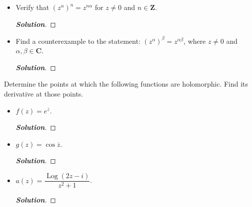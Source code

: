 \documentclass[11pt]{article}
\newenvironment{problem}[2][Problem\!]{\begin{trivlist}
\item[\hskip \labelsep {\bfseries #1}\hskip \labelsep {\bfseries #2.}]}{\end{trivlist}}
\newenvironment{solution}{\begin{proof}[\textbf{\textit{Solution}}]}{\end{proof}}
\newcommand{\zz}{\mathbf Z}   %
\newcommand{\cc}{\mathbf C}   %
\newcommand{\plog}{\operatorname{Log}} %
\begin{document}
\newpage  %

\begin{problem}{5.3}\hfill
\begin{itemize}[itemsep=3em]
\item[(a)] Verify that $(z^\alpha)^n = z^{n\alpha}$ for $z \neq 0$ and $n \in \zz$.
\begin{solution}
\end{solution}

\item[(b)] Find a counterexample to the statement: $(z^{\alpha})^\beta = z^{\alpha\beta}$, where $z \neq 0$ and $\alpha,\beta \in \cc$.
\begin{solution}
\end{solution}

\end{itemize}
\end{problem}

\newpage  %

\begin{problem}{5.4}
Determine the points at which the following functions are holomorphic. Find its derivative at those points.
\begin{itemize}[itemsep=3em]
\item[(a)] $f(z) = e^{\overline{z}}$.
\begin{solution}
\end{solution}

\item[(b)] $g(z) = \cos\overline{z}$.
\begin{solution}
\end{solution}

\item[(c)] $a(z) = \dfrac{\plog(2z - i)}{z^2 + 1}$.
\begin{solution}
\end{solution}

\end{itemize}
\end{problem}
\end{document}
